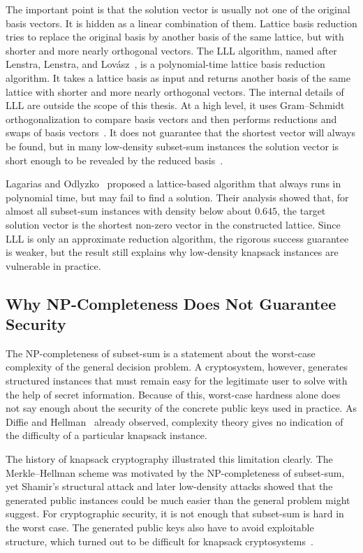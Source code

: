 The important point is that the solution vector is usually not one of the
original basis vectors. It is hidden as a linear combination of them. Lattice
basis reduction tries to replace the original basis by another basis of the
same lattice, but with shorter and more nearly orthogonal vectors. The LLL
algorithm, named after Lenstra, Lenstra, and Lov\'asz~\cite{LenstraLenstraLovasz1982},
is a polynomial-time lattice basis reduction algorithm. It takes a lattice basis
as input and returns another basis of the same lattice with shorter and more
nearly orthogonal vectors. The internal details of LLL are outside the scope of
this thesis. At a high level, it uses Gram--Schmidt orthogonalization to compare
basis vectors and then performs reductions and swaps of basis
vectors~\cite{LenstraLenstraLovasz1982}. It does not guarantee that the shortest vector will
always be found, but in many low-density subset-sum instances the solution
vector is short enough to be revealed by the reduced
basis~\cite{LenstraLenstraLovasz1982,LagariasOdlyzko1985}.

Lagarias and Odlyzko~\cite{LagariasOdlyzko1985} proposed a lattice-based
algorithm that always runs in polynomial time, but may fail to find a solution.
Their analysis showed that, for almost all subset-sum instances with density
below about \(0.645\), the target solution vector is the shortest non-zero
vector in the constructed lattice. Since LLL is only an approximate reduction
algorithm, the rigorous success guarantee is weaker, but the result still
explains why low-density knapsack instances are vulnerable in practice.

\subsection{Why NP-Completeness Does Not Guarantee Security}

The NP-completeness of subset-sum is a statement about the worst-case
complexity of the general decision problem. A cryptosystem, however, generates
structured instances that must remain easy for the legitimate user to solve
with the help of secret information. Because of this, worst-case hardness alone
does not say enough about the security of the concrete public keys used in
practice. As Diffie and Hellman~\cite[p.~654]{diffie1976newDirections} already observed, complexity theory gives no
indication of the difficulty of a particular knapsack
instance.

The history of knapsack cryptography illustrated this limitation clearly. The
Merkle--Hellman scheme was motivated by the NP-completeness of subset-sum, yet
Shamir's structural attack and later low-density attacks showed that the
generated public instances could be much easier than the general problem might
suggest. For cryptographic security, it is not enough that subset-sum is hard
in the worst case. The generated public keys also have to avoid exploitable
structure, which turned out to be difficult for knapsack
cryptosystems~\cite{OdlyzkoRiseFall}.

